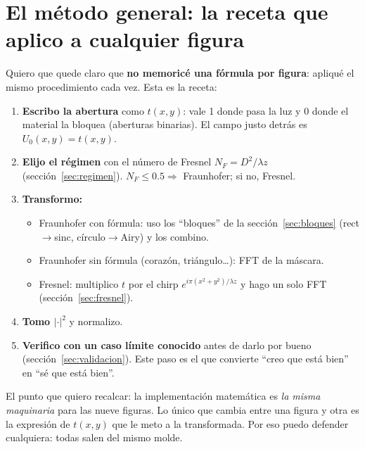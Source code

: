 \documentclass[11pt,a4paper]{article}
\begin{document}
\section{El método general: la receta que aplico a cualquier figura}

Quiero que quede claro que \textbf{no memoricé una fórmula por figura}: apliqué el
mismo procedimiento cada vez. Esta es la receta:

\begin{enumerate}[leftmargin=1.5em]
\item \textbf{Escribo la abertura} como $t(x,y)$: vale 1 donde pasa la luz y 0
donde el material la bloquea (aberturas binarias). El campo justo detrás es
$U_0(x,y)=t(x,y)$.
\item \textbf{Elijo el régimen} con el número de Fresnel $N_F=D^2/\lambda z$
(sección~\ref{sec:regimen}). $N_F\le0.5\Rightarrow$ Fraunhofer; si no, Fresnel.
\item \textbf{Transformo:}
   \begin{itemize}[leftmargin=1.3em]
   \item Fraunhofer con fórmula: uso los ``bloques'' de la
   sección~\ref{sec:bloques} (rect$\to$sinc, círculo$\to$Airy) y los combino.
   \item Fraunhofer sin fórmula (corazón, triángulo\ldots): FFT de la máscara.
   \item Fresnel: multiplico $t$ por el chirp $e^{i\pi(x^2+y^2)/\lambda z}$ y hago
   un solo FFT (sección~\ref{sec:fresnel}).
   \end{itemize}
\item \textbf{Tomo $|\cdot|^2$} y normalizo.
\item \textbf{Verifico con un caso límite conocido} antes de darlo por bueno
(sección~\ref{sec:validacion}). Este paso es el que convierte ``creo que está
bien'' en ``sé que está bien''.
\end{enumerate}

\begin{decir}
El punto que quiero recalcar: la implementación matemática es \emph{la misma
maquinaria} para las nueve figuras. Lo único que cambia entre una figura y otra es
la expresión de $t(x,y)$ que le meto a la transformada. Por eso puedo defender
cualquiera: todas salen del mismo molde.
\end{decir}

\end{document}
